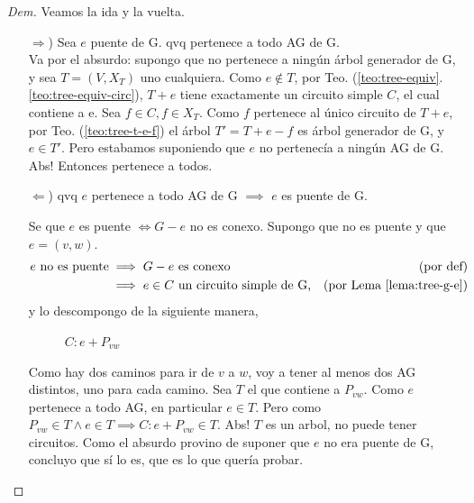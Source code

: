\documentclass[12pt, a4paper]{report}
\theoremstyle{definition} %
\begin{document}
\begin{proof}[Dem]
    Veamos la ida y la vuelta.

    \begin{enumerate}
        \item[$\Rightarrow$)] Sea $e$ puente de G. qvq pertenece a todo AG de G.\\
        Va por el absurdo: supongo que no pertenece a ningún árbol generador de G, y sea $T = (V, X_T)$ uno cualquiera. Como $e \notin T$, por Teo. (\ref{teo:tree-equiv}.\ref{teo:tree-equiv-circ}), $T + e$ tiene exactamente un circuito simple $C$, el cual contiene a e. Sea $f \in C, f \in X_T$. Como $f$ pertenece al único circuito de $T + e$, por Teo. (\ref{teo:tree-t-e-f}) el árbol $T' = T + e - f$ es árbol generador de G, y $e \in T'$. Pero estabamos suponiendo que $e$ no pertenecía a ningún AG de G. Abs! Entonces pertenece a todos.

        \item[$\Leftarrow$)] qvq $e$ pertenece a todo AG de G $\implies$ $e$ es puente de G.
         
        Se que $e$ es puente $\iff G - e$ no es conexo. Supongo que no es puente y que $e = (v, w)$.
        \begin{align*}
            e\ \text{no es puente} &\implies G - e\ \text{es conexo}    & (\text{por def})\\
            &\implies e \in C\ \text{un circuito simple de G,} & (\text{por Lema \ref{lema:tree-g-e}})
        \end{align*}
        y lo descompongo de la siguiente manera,

        \begin{figure}[H]
            \centering
            \caption*{$C: e + P_{vw}$}
        \end{figure}

        Como hay dos caminos para ir de $v$ a $w$, voy a tener al menos dos AG distintos, uno para cada camino. Sea $T$ el que contiene a $P_{vw}$. Como $e$ pertenece a todo AG, en particular $e \in T$. Pero como $P_{vw} \in T \wedge e \in T \implies C: e + P_{vw} \in T$. Abs! $T$ es un arbol, no puede tener circuitos. Como el absurdo provino de suponer que $e$ no era puente de G, concluyo que sí lo es, que es lo que quería probar.

    \end{enumerate}

\end{proof}
\end{document}
